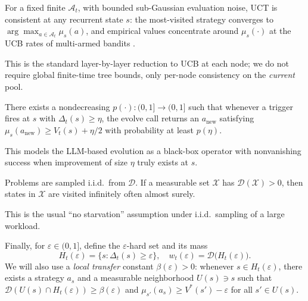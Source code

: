 \begin{assumption}
\label{ass:uct-consistency}
For a fixed finite $\mathcal A_t$, with bounded sub-Gaussian evaluation noise, UCT is consistent at any recurrent state $s$: the most-visited strategy converges to $\arg\max_{a\in\mathcal A_t}\mu_s(a)$, and empirical values concentrate around $\mu_s(\cdot)$ at the UCB rates of multi-armed bandits \citep{kocsis2006bandit}. 
\end{assumption}

\begin{remark}
This is the standard layer-by-layer reduction to UCB at each node; we do not require global finite-time tree bounds, only per-node consistency on the \emph{current} pool.
\end{remark}

\begin{assumption}
\label{ass:succ}
There exists a nondecreasing $p(\cdot):(0,1]\to(0,1]$ such that whenever a trigger fires at $s$ with $\Delta_t(s)\ge\eta$, the evolve call returns an $a_{\mathrm{new}}$ satisfying 
$\mu_s(a_{\mathrm{new}})\ge V_t(s)+\eta/2$
with probability at least $p(\eta)$.
\end{assumption}

\begin{remark}
This models the LLM-based evolution as a black-box operator with nonvanishing success when improvement of size $\eta$ truly exists at $s$.
\end{remark}

\begin{assumption}
\label{ass:exposure}
Problems are sampled i.i.d.\ from $\mathcal D$. If a measurable set $\mathcal X$ has $\mathcal D(\mathcal X)>0$, then states in $\mathcal X$ are visited infinitely often almost surely.
\end{assumption}

\begin{remark}
This is the usual ``no starvation'' assumption under i.i.d.\ sampling of a large workload.
\end{remark}

Finally, for $\varepsilon\in(0,1]$, define the $\varepsilon$-hard set and its mass
\[
H_t(\varepsilon)=\{s:\Delta_t(s)\ge\varepsilon\},\quad w_t(\varepsilon)=\mathcal D\big(H_t(\varepsilon)\big).
\]
We will also use a \emph{local transfer} constant $\beta(\varepsilon)>0$: whenever $s\in H_t(\varepsilon)$, there exists a strategy $a_s$ and a measurable neighborhood $U(s)\ni s$ such that $\mathcal D(U(s)\cap H_t(\varepsilon))\ge\beta(\varepsilon)$ and $\mu_{s'}(a_s)\ge V^*(s')-\varepsilon$ for all $s'\in U(s)$.

